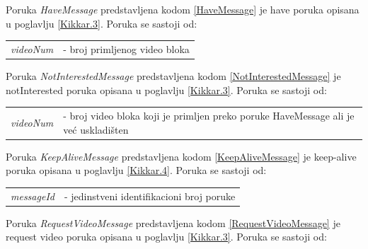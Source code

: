 \documentclass[12pt,oneside]{memoir}
\begin{document}


Poruka \textit{HaveMessage} predstavljena kodom \ref{HaveMessage} je have poruka opisana u poglavlju \ref{Kikkar.3}. Poruka se sastoji od:
 
\begin{center}
\begin{tabular}{ p{4.5cm} p{9.5cm} }
 \textit{videoNum} & - broj primljenog video bloka \\ 
\end{tabular}
\end{center}




Poruka \textit{NotInterestedMessage} predstavljena kodom \ref{NotInterestedMessage} je notInterested poruka opisana u poglavlju \ref{Kikkar.3}. Poruka se sastoji od:
 
\begin{center}
\begin{tabular}{ p{4cm} p{10cm} }
 \textit{videoNum} & - broj video bloka koji je primljen preko poruke HaveMessage ali je već uskladišten \\ 
\end{tabular}
\end{center}




Poruka \textit{KeepAliveMessage} predstavljena kodom \ref{KeepAliveMessage} je keep-alive poruka opisana u poglavlju \ref{Kikkar.4}. Poruka se sastoji od:
 
\begin{center}
\begin{tabular}{ p{4cm} p{10cm} }
 \textit{messageId} & - jedinstveni identifikacioni broj poruke \\ 
\end{tabular}
\end{center}




Poruka \textit{RequestVideoMessage} predstavljena kodom \ref{RequestVideoMessage} je request video poruka opisana u poglavlju \ref{Kikkar.3}. Poruka se sastoji od:
 
\end{document}
